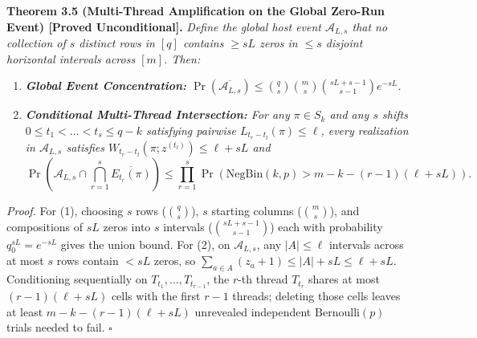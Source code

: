 \documentclass[
  11pt,
]{article}
\providecommand{\tightlist}{%
  \setlength{\itemsep}{0pt}\setlength{\parskip}{0pt}}
\begin{document}
\textbf{Theorem 3.5 (Multi-Thread Amplification on the Global Zero-Run Event) [Proved Unconditional].}
\emph{Define the global host event \(\mathcal{A}_{L, s}\) that no collection of \(s\) distinct rows in \([q]\) contains \(\ge s L\) zeros in \(\le s\) disjoint horizontal intervals across \([m]\). Then:}
\begin{enumerate}
\def\labelenumi{\arabic{enumi}.}
\tightlist
\item \emph{\textbf{Global Event Concentration:} \(\Pr(\overline{\mathcal{A}_{L, s}}) \le \binom{q}{s} \binom{m}{s} \binom{sL + s - 1}{s - 1} e^{-sL}\).}
\item \emph{\textbf{Conditional Multi-Thread Intersection:} For any \(\pi \in S_k\) and any \(s\) shifts \(0 \le t_1 < \dots < t_s \le q - k\) satisfying pairwise \(L_{t_r - t_l}(\pi) \le \ell\), every realization in \(\mathcal{A}_{L, s}\) satisfies \(W_{t_r - t_l}(\pi; z^{(t_l)}) \le \ell + sL\) and}
\begin{equation}
\Pr\left( \mathcal{A}_{L, s} \cap \bigcap_{r=1}^s \overline{E_{t_r}(\pi)} \right) \le \prod_{r=1}^s \Pr(\mathrm{NegBin}(k, p) > m - k - (r - 1)(\ell + sL)).
\end{equation}
\end{enumerate}

\emph{Proof.} For (1), choosing \(s\) rows (\(\binom{q}{s}\)), \(s\) starting columns (\(\binom{m}{s}\)), and compositions of \(sL\) zeros into \(s\) intervals (\(\binom{sL+s-1}{s-1}\)) each with probability \(q_0^{sL} = e^{-sL}\) gives the union bound. For (2), on \(\mathcal{A}_{L, s}\), any \(|A| \le \ell\) intervals across at most \(s\) rows contain \(< sL\) zeros, so \(\sum_{a \in A}(z_a + 1) \le |A| + sL \le \ell + sL\). Conditioning sequentially on \(T_{t_1}, \dots, T_{t_{r-1}}\), the \(r\)-th thread \(T_{t_r}\) shares at most \((r-1)(\ell + sL)\) cells with the first \(r-1\) threads; deleting those cells leaves at least \(m - k - (r-1)(\ell + sL)\) unrevealed independent \(\mathrm{Bernoulli}(p)\) trials needed to fail. \(\square\)
\end{document}
